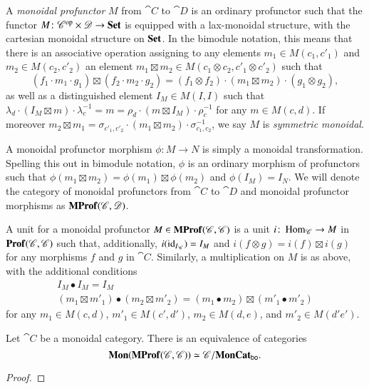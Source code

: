 \documentclass[12pt,oneside,article,draft]{memoir}
\begin{document}
A \emph{monoidal profunctor} $M$ from $\cat{C}$ to $\cat{D}$ is an ordinary profunctor such that the functor $M\colon {\mathscr{C}}^{\text{op}}\times\mathscr{D}\to\mathbf{Set}$ is equipped with a lax-monoidal structure, with the cartesian monoidal structure on $\mathbf{Set}$.
In the bimodule notation, this means that there is an associative operation assigning to any elements $m_1\in M(c_1,c'_1)$ and $m_2\in M(c_2,c'_2)$ an element $m_1\boxtimes m_2\in M(c_1\otimes c_2,c'_1\otimes c'_2)$ such that
\[
	(f_1\cdot m_1\cdot g_1)\boxtimes(f_2\cdot m_2\cdot g_2) = (f_1\otimes f_2)\cdot(m_1\boxtimes m_2)\cdot(g_1\otimes g_2),
\]
as well as a distinguished element $I_M\in M(I,I)$ such that $\lambda_d\cdot(I_M\boxtimes m)\cdot\lambda^{-1}_c = m = \rho_d\cdot(m\boxtimes I_M)\cdot\rho^{-1}_c$ for any $m\in M(c,d)$.
If moreover $m_2\boxtimes m_1 = \sigma_{c'_1,c'_2}\cdot(m_1\boxtimes m_2)\cdot\sigma_{c_1,c_2}^{-1}$, we say $M$ is \emph{symmetric monoidal}.

A monoidal profunctor morphism $\phi\colon M\to N$ is simply a monoidal transformation.
Spelling this out in bimodule notation, $\phi$ is an ordinary morphism of profunctors such that $\phi(m_1\boxtimes m_2)=\phi(m_1)\boxtimes\phi(m_2)$ and $\phi(I_M)=I_N$.
We will denote the category of monoidal profunctors from $\cat{C}$ to $\cat{D}$ and monoidal profunctor morphisms as $\mathbf{MProf}(\mathscr{C},\mathscr{D})$. 

A unit for a monoidal profunctor $M\in\mathbf{MProf}(\mathscr{C},\mathscr{C})$ is a unit $i\colon\operatorname{Hom}_{\mathscr{C}}\to M$ in $\mathbf{Prof}(\mathscr{C},\mathscr{C})$ such that, additionally, $i(\operatorname{id}_{I_{\mathscr{C}}})=I_M$ and $i(f\otimes g)=i(f)\boxtimes i(g)$ for any morphisms $f$ and $g$ in $\cat{C}$.
Similarly, a multiplication on $M$ is as above, with the additional conditions
\begin{gather*}
	I_M\bullet I_M=I_M \\
	(m_1\boxtimes m'_1)\bullet(m_2\boxtimes m'_2) = (m_1\bullet m_2)\boxtimes(m'_1\bullet m'_2)
\end{gather*}
for any $m_1\in M(c,d)$, $m'_1\in M(c',d')$, $m_2\in M(d,e)$, and $m'_2\in M(d'e')$.

\begin{lemma}\label{Lem:mon profs equal boo functors}
	Let $\cat{C}$ be a monoidal category.
	There is an equivalence of categories 
	\[
		\mathbf{Mon}(\mathbf{MProf}(\mathscr{C},\mathscr{C}))\simeq \mathscr{C}/\mathbf{MonCat}_{\mathsf{bo}}.
	\]
\end{lemma}
\begin{proof}
\end{proof}
\end{document}
